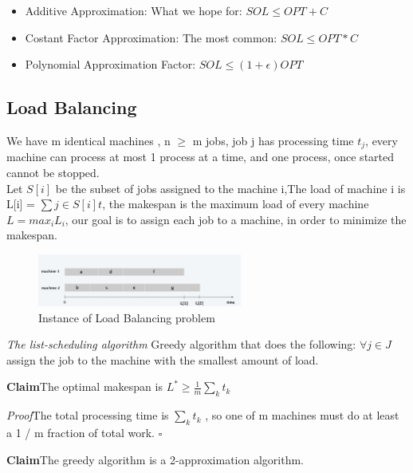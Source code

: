\documentclass[11pt]{article}
\newenvironment{claim}[1]{\par\textbf{Claim}\space#1}{}
\newenvironment{proof}[1]{\par\textit{Proof}\space#1}{\hfill\ensuremath{\square}}
\begin{document}
\begin{itemize}
\item{Additive Approximation}: What we hope for: $SOL \leq OPT + C$ 
\item{Costant Factor Approximation}: The most common: $SOL \leq OPT * C$
\item{Polynomial Approximation Factor}: $SOL \leq (1+\epsilon)OPT $
\end{itemize}

\subsection{Load Balancing}
We have m identical machines , n $\geq$ m jobs, job j has processing time $t_{j}$, every machine can process at most 1 process at a time, and one process, once started cannot be stopped.\\
Let $S[i]$ be the subset of jobs assigned to the machine i,The load of machine i is L[i] = $\sum j \in S[i] t$, the makespan is the maximum load of every machine $L=max_{i}L_{i}$, our goal is to assign each job to a machine, in order to minimize the makespan.

\begin{figure}[H]
		\centering
		\includegraphics[width=0.6\textwidth ]{loadBalancing}
		\caption{Instance of Load Balancing problem}
\end{figure}

\emph{The list-scheduling algorithm}
Greedy algorithm that does the following: $\forall j \in J$ assign the job to the machine with the smallest amount of load.\\

\begin{claim}
The optimal makespan is $L^{*} \geq \frac{1}{m} \sum _{k} t_{k}$ 
\end{claim}\\

\begin{proof}
The total processing time is $\sum_{k} t_{k}$ , so one of m machines must do at least a 1 / m fraction of total work.
\end{proof}\\

\begin{claim}
The greedy algorithm is a 2-approximation algorithm.
\end{claim}\\
\end{document}
